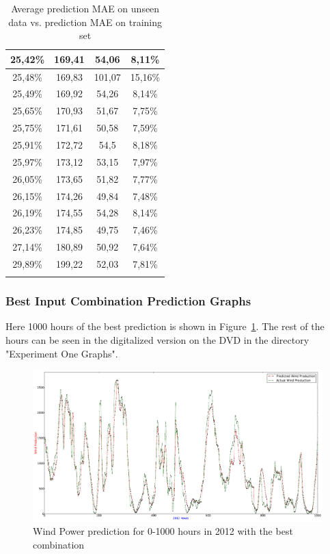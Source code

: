 \begin{center}
\begin{longtable}{|c|c|c|c|}
25,42\% & 169,41 & 54,06 & 8,11\%  \\ \hline
25,48\% & 169,83 & 101,07 & 15,16\%  \\ \hline
25,49\% & 169,92 & 54,26 & 8,14\%  \\ \hline
25,65\% & 170,93 & 51,67 & 7,75\%  \\ \hline
25,75\% & 171,61 & 50,58 & 7,59\%  \\ \hline
25,91\% & 172,72 & 54,5 & 8,18\%  \\ \hline
25,97\% & 173,12 & 53,15 & 7,97\%  \\ \hline
26,05\% & 173,65 & 51,82 & 7,77\%  \\ \hline
26,15\% & 174,26 & 49,84 & 7,48\%  \\ \hline
26,19\% & 174,55 & 54,28 & 8,14\%  \\ \hline
26,23\% & 174,85 & 49,75 & 7,46\%  \\ \hline
27,14\% & 180,89 & 50,92 & 7,64\%  \\ \hline
29,89\% & 199,22 & 52,03 & 7,81\%  \\ \hline
\caption{Average prediction MAE on unseen data vs. prediction MAE on training set}
\label{table:predictionMAEUnseenVsTrainingSetAppendix}
\end{longtable}
\end{center}
\normalsize
\newpage
\subsubsection{Best Input Combination Prediction Graphs}
\label{sec:bestCombiPredictionsGraphs}
Here 1000 hours of the best prediction is shown in Figure~\ref{fig:experimentOneInput}. The rest of the hours can be seen in the digitalized version on the DVD in the directory "Experiment One Graphs".

\begin{figure}
\centering
\includegraphics[width=0.99\linewidth]{billeder/experimentOneInput.png}
\caption{Wind Power prediction for 0-1000 hours in 2012 with the best combination}
\label{fig:experimentOneInput}
\end{figure} 

